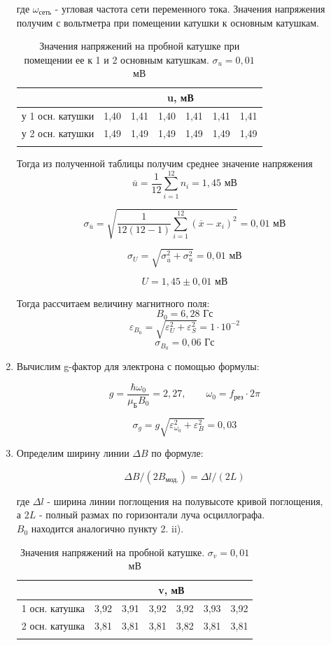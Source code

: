 \documentclass[a4paper, 12pt]{article}%
\begin{document}
\begin{enumerate}
		где $\omega_{\text{сеть}}$ - угловая частота сети переменного тока.
		Значения напряжения получим с вольтметра при помещении катушки к основным катушкам.
		\begin{longtable}{|c|c|c|c|c|c|c|}
			\hline
			& \multicolumn{6}{c|}{u, мВ} \\ \hline
			у 1 осн. катушки & 1,40 & 1,41 & 1,40 & 1,41 & 1,41 & 1,41 \\ \hline
			у 2 осн. катушки & 1,49 & 1,49 & 1,49 & 1,49 & 1,49 & 1,49 \\ \hline
			\caption{Значения напряжений на пробной катушке при помещении ее к 1 и 2 основным катушкам. $\sigma_u = 0,01$ мВ}
		\end{longtable}
		Тогда из полученной таблицы получим среднее значение напряжения
		$$\overline{u} = \frac{1}{12} \sum_{i = 1}^{12} n_i = 1,45 \text{ мВ}$$
		
		$$ \sigma_{\overline{u}} = \sqrt{\frac{1}{12(12-1)} \sum_{i = 1}^{12} (\overline{x} - x_i)^2} = 0,01 \text{ мВ}$$
		
		$$ \sigma_{U} = \sqrt{\sigma_{\overline{u}}^2 + \sigma_{u}^2 } = 0,01 \text{ мВ}$$
		
		$$ U = 1,45 \pm 0,01 \text{ мВ} $$
		
		Тогда рассчитаем величину магнитного поля:
		$$ B_0 = 6,28 \text{ Гс}$$
		$$ \varepsilon_{B_0} = \sqrt{\varepsilon_U^2 + \varepsilon_S^2} = 1 \cdot 10^{-2} $$
		$$ \sigma_{B_0} = 0,06 \text{ Гс}$$
		
		
		\item Вычислим g-фактор для электрона с помощью формулы:
		
		$$ g = \frac{\hbar \omega_0}{\mu_{\text{Б}} {B_0}} = 2,27, \qquad \omega_0 = f_{\text{рез}} \cdot 2\pi$$
		
		$$ \sigma_g = g\sqrt{\varepsilon_{\omega_0}^2 + \varepsilon_{{B}}^2} = 0,03$$
		\item Определим ширину линии $\Delta B$ по формуле:
		
		$$ \Delta B /(2 B_{\text{мод.}}) = \Delta l / (2L) $$
		
		где $\Delta l$ - ширина линии поглощения на полувысоте кривой поглощения, \\
		а 2$L$ - полный размах по горизонтали луча осциллографа. \\
		
		
		$ B_{0} $ находится аналогично пункту 2. ii).
		\begin{longtable}{|c|c|c|c|c|c|c|}
			\hline
			& \multicolumn{6}{c|}{v, мВ} \\ \hline
			1 осн. катушка & 3,92 & 3,91 & 3,92 & 3,92 & 3,93 & 3,92 \\ \hline
			2 осн. катушка & 3,81 & 3,81 & 3,81 & 3,82 & 3,81 & 3,81 \\ \hline
			\caption{Значения напряжений на пробной катушке. $\sigma_v = 0,01$ мВ}
		\end{longtable}
		

\end{enumerate}
\end{document}
